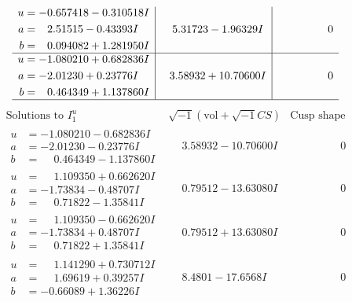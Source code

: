 \documentclass[1p]{elsarticle_modified}
\theoremstyle{definition}
\newcommand{\I}{\sqrt{-1}}
\begin{document}
$$\begin{array}{c|c|c}
\begin{aligned}
u &= -0.657418 - 0.310518 I \\
a &= \phantom{-}2.51515 - 0.43393 I \\
b &= \phantom{-}0.094082 + 1.281950 I\end{aligned}
 & \phantom{-}5.31723 - 1.96329 I & \phantom{-0.000000 } 0 \\ \hline\begin{aligned}
u &= -1.080210 + 0.682836 I \\
a &= -2.01230 + 0.23776 I \\
b &= \phantom{-}0.464349 + 1.137860 I\end{aligned}
 & \phantom{-}3.58932 + 10.70600 I & \phantom{-0.000000 } 0\\
 \hline 
 \end{array}$$\newpage$$\begin{array}{c|c|c}  
\text{Solutions to }I^u_{1}& \I (\text{vol} + \sqrt{-1}CS) & \text{Cusp shape}\\
 \hline 
\begin{aligned}
u &= -1.080210 - 0.682836 I \\
a &= -2.01230 - 0.23776 I \\
b &= \phantom{-}0.464349 - 1.137860 I\end{aligned}
 & \phantom{-}3.58932 - 10.70600 I & \phantom{-0.000000 } 0 \\ \hline\begin{aligned}
u &= \phantom{-}1.109350 + 0.662620 I \\
a &= -1.73834 - 0.48707 I \\
b &= \phantom{-}0.71822 - 1.35841 I\end{aligned}
 & \phantom{-}0.79512 - 13.63080 I & \phantom{-0.000000 } 0 \\ \hline\begin{aligned}
u &= \phantom{-}1.109350 - 0.662620 I \\
a &= -1.73834 + 0.48707 I \\
b &= \phantom{-}0.71822 + 1.35841 I\end{aligned}
 & \phantom{-}0.79512 + 13.63080 I & \phantom{-0.000000 } 0 \\ \hline\begin{aligned}
u &= \phantom{-}1.141290 + 0.730712 I \\
a &= \phantom{-}1.69619 + 0.39257 I \\
b &= -0.66089 + 1.36226 I\end{aligned}
 & \phantom{-}8.4801 - 17.6568 I & \phantom{-0.000000 } 0 \\ \hline\begin{aligned}

\end{aligned}
\end{array}$$
\end{document}
